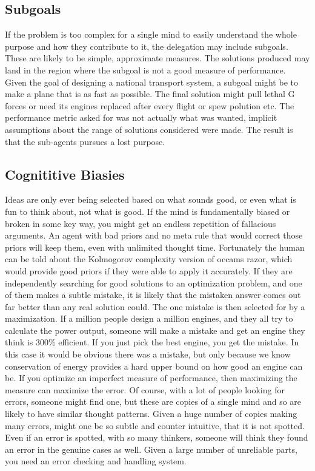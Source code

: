 \documentclass[12pt]{article}
\begin{document}
\subsection{Subgoals}
 If the problem is too complex for a single mind to easily understand the whole purpose and how they contribute to it, the delegation may include subgoals. These are likely to be simple, approximate measures. The solutions produced may land in the region where the subgoal is not a good measure of performance. Given the goal of designing a national transport system, a subgoal might be to make a plane that is as fast as possible. The final solution might pull lethal G forces or need its engines replaced after every flight or spew polution etc. The performance metric asked for was not actually what was wanted, implicit assumptions about the range of solutions considered were made. The result is that the sub-agents pursues a lost purpose.\\
\subsection{Cognititive Biasies}

 Ideas are only ever being selected based on what sounds good, or even what is fun to think about, not what is good. If the mind is fundamentally biased or broken in some key way, you might get an endless repetition of fallacious arguments. An agent with bad priors and no meta rule that would correct those priors will keep them, even with unlimited thought time. Fortunately the human can be told about the Kolmogorov complexity version of occams razor, which would provide good priors if they were able to apply it accurately. If they are independently searching for good solutions to an optimization problem, and one of them makes a subtle mistake, it is likely that the mistaken answer comes out far better than any real solution could. The one mistake is then selected for by a maximization. If a million people design a million engines, and they all try to calculate the power output, someone will make a mistake and get an engine they think is 300\% efficient. If you just pick the best engine, you get the mistake.  In this case it would be obvious there was a mistake, but only because we know conservation of energy provides a hard upper bound on how good an engine can be. If you optimize an imperfect measure of performance, then maximizing the measure can maximize the error. Of course, with a lot of people looking for errors, someone might find one, but these are copies of a single mind and so are likely to have similar thought patterns. Given a huge number of copies making many errors, might one be so subtle and counter intuitive, that it is not spotted. Even if an error is spotted, with so many thinkers, someone will think they found an error in the genuine cases as well. Given a large number of unreliable parts, you need an error checking and handling system.
  
\end{document}
